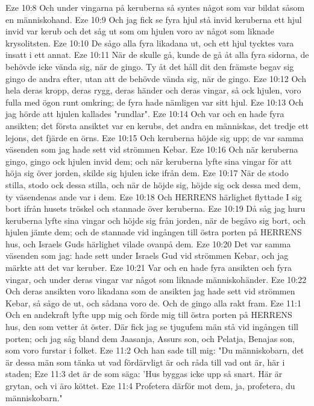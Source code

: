 Eze 10:8  Och under vingarna på keruberna så syntes något som var bildat såsom en människohand.
Eze 10:9  Och jag fick se fyra hjul stå invid keruberna ett hjul invid var kerub och det såg ut som om hjulen voro av något som liknade krysolitsten.
Eze 10:10  De sågo alla fyra likadana ut, och ett hjul tycktes vara insatt i ett annat.
Eze 10:11  När de skulle gå, kunde de gå åt alla fyra sidorna, de behövde icke vända sig, när de gingo. Ty åt det håll dit den främste begav sig gingo de andra efter, utan att de behövde vända sig, när de gingo.
Eze 10:12  Och hela deras kropp, deras rygg, deras händer och deras vingar, så ock hjulen, voro fulla med ögon runt omkring; de fyra hade nämligen var sitt hjul.
Eze 10:13  Och jag hörde att hjulen kallades "rundlar".
Eze 10:14  Och var och en hade fyra ansikten; det första ansiktet var en kerubs, det andra en människas, det tredje ett lejons, det fjärde en örns.
Eze 10:15  Och keruberna höjde sig upp; de var samma väsenden som jag hade sett vid strömmen Kebar.
Eze 10:16  Och när keruberna gingo, gingo ock hjulen invid dem; och när keruberna lyfte sina vingar för att höja sig över jorden, skilde sig hjulen icke ifrån dem.
Eze 10:17  När de stodo stilla, stodo ock dessa stilla, och när de höjde sig, höjde sig ock dessa med dem, ty väsendenas ande var i dem.
Eze 10:18  Och HERRENS härlighet flyttade I sig bort ifrån husets tröskel och stannade över keruberna.
Eze 10:19  Då såg jag huru keruberna lyfte sina vingar och höjde sig från jorden, när de begåvo sig bort, och hjulen jämte dem; och de stannade vid ingången till östra porten på HERRENS hus, och Israels Guds härlighet vilade ovanpå dem.
Eze 10:20  Det var samma väsenden som jag: hade sett under Israels Gud vid strömmen Kebar, och jag märkte att det var keruber.
Eze 10:21  Var och en hade fyra ansikten och fyra vingar, och under deras vingar var något som liknade människohänder.
Eze 10:22  Och deras ansikten voro likadana som de ansikten jag hade sett vid strömmen Kebar, så sågo de ut, och sådana voro de. Och de gingo alla rakt fram.
Eze 11:1  Och en andekraft lyfte upp mig och förde mig till östra porten på HERRENS hus, den som vetter åt öster. Där fick jag se tjugufem män stå vid ingången till porten; och jag såg bland dem Jaasanja, Assurs son, och Pelatja, Benajas son, som voro furstar i folket.
Eze 11:2  Och han sade till mig: "Du människobarn, det är dessa män som tänka ut vad fördärvligt är och råda till vad ont är, här i staden;
Eze 11:3  det är de som säga: 'Hus byggas icke upp så snart. Här är grytan, och vi äro köttet.
Eze 11:4  Profetera därför mot dem, ja, profetera, du människobarn."
